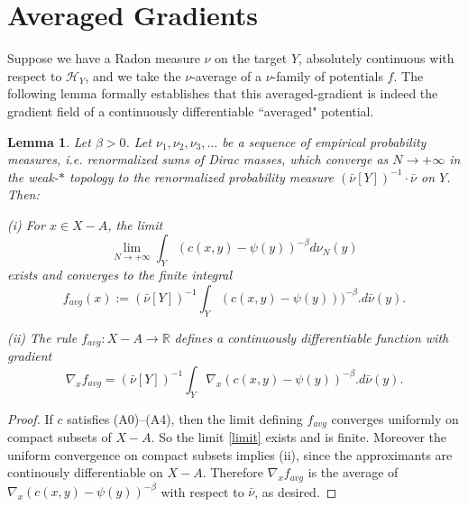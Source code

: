 \documentclass[12pt]{amsart}
\newtheorem{lem}{Lemma}
\theoremstyle{definition}
\theoremstyle{remark}
\newcommand{\bR}{\mathbb{R}}
\begin{document}















\section{Averaged Gradients} 
Suppose we have a Radon measure $\nu$ on the target $Y$, absolutely continuous with respect to $\mathscr{H}_Y$, and we take the $\nu$-average of a $\nu$-family of potentials $f$. The following lemma formally establishes that this averaged-gradient is indeed the gradient field of a continuously differentiable ``averaged" potential. 

\begin{lem}\label{avgpot} 
Let $\beta>0$. Let $\nu_1, \nu_2, \nu_3, \ldots$ be a sequence of empirical probability measures, i.e. renormalized sums of Dirac masses, which converge as $N\to +\infty$ in the weak-$*$ topology to the renormalized probability measure $(\bar{\nu}[Y])^{-1} \cdot \bar{\nu}$ on $Y$. Then:

(i) For $x\in X-A$, the limit \begin{equation}\label{limit}\lim_{N\to +\infty}  \int_Y (c(x,y) -\psi(y))^{-\beta} d\nu_N(y)\end{equation} exists and converges to the finite integral \begin{equation}\label{favg} f_{avg}(x):=(\bar{\nu}[Y])^{-1} \int_Y (c(x,y)-\psi(y)))^{-\beta}. d\bar{\nu}(y).\end{equation} 

(ii) The rule $f_{avg}: X-A \to \bR$ defines a continuously differentiable function with gradient $$\nabla_x f_{avg}=(\bar{\nu}[Y])^{-1} \int _Y \nabla_x (c(x,y)-\psi(y))^{-\beta}.d\bar{\nu}(y).$$ 
\end{lem}

\begin{proof}
If $c$ satisfies (A0)--(A4), then the limit defining $f_{avg}$ converges uniformly on compact subsets of $X-A$. So the limit \eqref{limit} exists and is finite. Moreover the uniform convergence on compact subsets implies (ii), since the approximants are continously differentiable on $X-A$. Therefore $\nabla_x f_{avg}$ is the average of $\nabla_x (c(x,y)-\psi(y))^{-\beta}$ with respect to $\bar{\nu}$, as desired.  
\end{proof}
\end{document}
